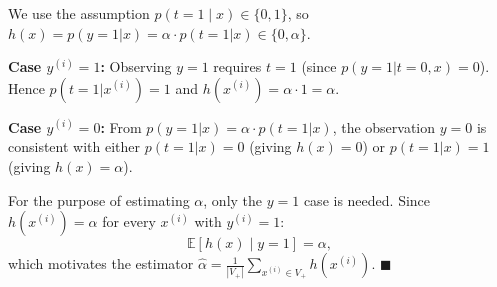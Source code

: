 \begin{answer}
We use the assumption $p(t=1\mid x)\in\{0,1\}$, so $h(x) = p(y=1|x) = \alpha\cdot p(t=1|x) \in \{0, \alpha\}$.

\textbf{Case $y^{(i)}=1$:} Observing $y=1$ requires $t=1$ (since $p(y=1|t=0,x)=0$). Hence $p(t=1|x^{(i)})=1$ and $h(x^{(i)}) = \alpha\cdot 1 = \alpha$.

\textbf{Case $y^{(i)}=0$:} From $p(y=1|x)=\alpha\cdot p(t=1|x)$, the observation $y=0$ is consistent with either $p(t=1|x)=0$ (giving $h(x)=0$) or $p(t=1|x)=1$ (giving $h(x)=\alpha$).

For the purpose of estimating $\alpha$, only the $y=1$ case is needed. Since $h(x^{(i)})=\alpha$ for every $x^{(i)}$ with $y^{(i)}=1$:
\[
\mathbb{E}[h(x)\mid y=1] = \alpha,
\]
which motivates the estimator $\hat\alpha = \frac{1}{|V_+|}\sum_{x^{(i)}\in V_+} h(x^{(i)})$. $\blacksquare$
\end{answer}
